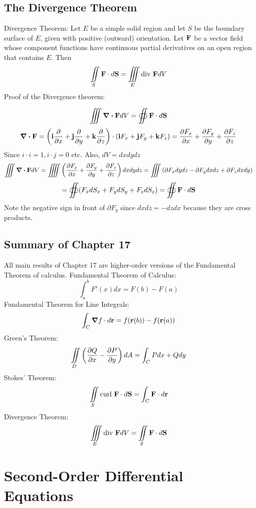 \documentclass{article}
\begin{document}
    \subsection{The Divergence Theorem}
    \begin{outline}
        \1 Divergence Theorem: Let $E$ be a simple solid region and let $S$ be the boundary surface of $E$, given with positive (outward) orientation. Let \(\vb F\) be a vector field whose component functions have continuous partial derivatives on an open region that contains $E$. Then \[\iint\limits_S\vb F\cdot d\vb S=\iiint\limits_E\text{div }\vb FdV\]
        \1 Proof of the Divergence theorem: 
    \end{outline}
    \[\iiint\div\vb FdV=\oiint\vb F\cdot d\vb S\]
    \[\div\vb F=\left(\vb i\pdv{x}+\vb j\pdv{y}+\vb k\pdv{z}\right)\cdot\left(\vb iF_x+\vb jF_y+\vb kF_z\right)=\pdv{F_x}{x}+\pdv{F_y}{y}+\pdv{F_z}{z}\]
    Since \(i\cdot i=1,i\cdot j=0\) etc. Also, \(dV=dxdydz\)
    \[\iiint\div\vb FdV=\iiiint\left(\pdv{F_x}{x}+\pdv{F_y}{y}+\pdv{F_z}{z}\right)dxdydz=\iiint\left(\partial F_xdydz-\partial F_ydxdz+\partial F_zdxdy\right)\]
    \[=\oiint(F_xdS_x+F_ydS_y+F_zdS_z)=\oiint\vb F\cdot d\vb S\]
    Note the negative sign in front of \(\partial F_y\) since \(dxdz=-dzdx\) because they are cross products. 
    \subsection{Summary of Chapter 17}
    \begin{outline}
        \1 All main results of Chapter 17 are higher-order versions of the Fundamental Theorem of calculus. 
        \1 Fundamental Theorem of Calculus: \[\int^b_aF'(x)dx=F(b)-F(a)\]
        \1 Fundamental Theorem for Line Integrals: \[\int_C\grad f\cdot d\vb r=f(\vb r(b)) - f(\vb r(a))\]
        \1 Green's Theorem: \[\iint\limits_D\left(\pdv{Q}{x}-\pdv{P}{y}\right)dA=\int_CPdx+Qdy\]
        \1 Stokes' Theorem: \[\iint\limits_S\text{curl }\vb F\cdot d\vb S=\int_C\vb F\cdot d\vb r\]
        \1 Divergence Theorem: \[\iiint\limits_E\text{div }\vb FdV=\iint\limits_S\vb F\cdot d\vb S\]
    \end{outline}

    \section{Second-Order Differential Equations} %
    
\end{document}
